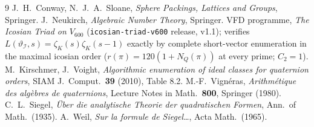\documentclass[11pt]{article}
\theoremstyle{definition}
\newcommand{\zetaK}{\zeta_{K}}
\newcommand{\Icos}{\mathcal{I}}
\renewcommand{\Theta}{\vartheta}
\begin{document}
\begin{thebibliography}{9}
 J.~H.~Conway, N.~J.~A.~Sloane, \emph{Sphere Packings, Lattices
  and Groups}, Springer.
 J.~Neukirch, \emph{Algebraic Number Theory}, Springer.
 VFD programme, \emph{The Icosian Triad on $V_{600}$}
  (\texttt{icosian-triad-v600} release, v1.1); verifies
  $L(\Theta_{\Icos},s)=\zetaK(s)\zetaK(s-1)$ exactly by complete short-vector
  enumeration in the maximal icosian order ($r(\pi)=120(1+N_Q(\pi))$ at every prime;
  $C_2=1$).
 M.~Kirschmer, J.~Voight, \emph{Algorithmic enumeration of
  ideal classes for quaternion orders}, SIAM J.\ Comput.\ \textbf{39} (2010), Table 8.2.
 M.-F.~Vign\'eras, \emph{Arithm\'etique des alg\`ebres de
  quaternions}, Lecture Notes in Math.\ \textbf{800}, Springer (1980).
 C.~L.~Siegel, \emph{\"Uber die analytische Theorie der quadratischen
  Formen}, Ann.\ of Math.\ (1935).
 A.~Weil, \emph{Sur la formule de Siegel\dots}, Acta Math.\ (1965).
\end{thebibliography}
\end{document}
